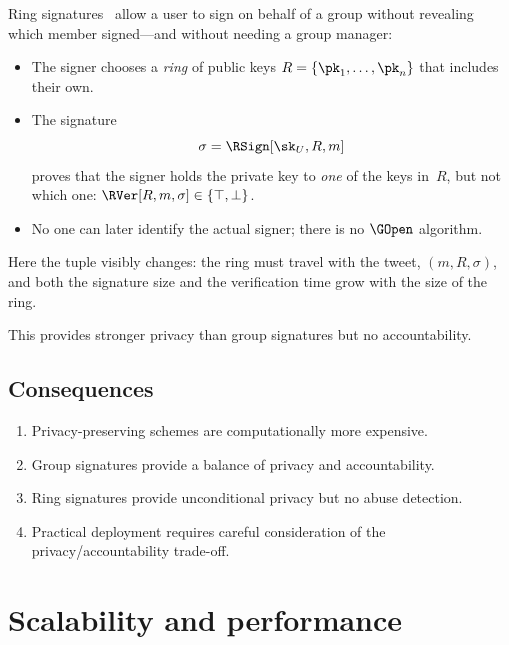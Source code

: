 Ring signatures~\autocite{RST2001ring} allow a user to sign on behalf of
a group without revealing which member signed---and without needing a
group manager:
\begin{itemize}
  \item The signer chooses a \emph{ring} of public keys
    \(R = \{\pk_1, \ldots, \pk_n\}\) that includes their own.
  \item The signature
    \[
      \sigma = \RSign[\sk_U, R, m]
    \]
    proves that the signer holds the private key to \emph{one} of the
    keys in~\(R\), but not which one:
    \(\RVer[R, m, \sigma] \in \{\top, \bot\}\).
  \item No one can later identify the actual signer; there is no
    \(\GOpen\) algorithm.
\end{itemize}

Here the tuple visibly changes: the ring must travel with the tweet,
\((m, R, \sigma)\), and both the signature size and the verification
time grow with the size of the ring.

This provides stronger privacy than group signatures but no
accountability.

\subsection{Consequences}

\begin{enumerate}
  \item Privacy-preserving schemes are computationally more expensive.
  \item Group signatures provide a balance of privacy and accountability.
  \item Ring signatures provide unconditional privacy but no abuse
    detection.
  \item Practical deployment requires careful consideration of the
    privacy/accountability trade-off.
\end{enumerate}


\section{Scalability and performance}\label{BotScalability}


